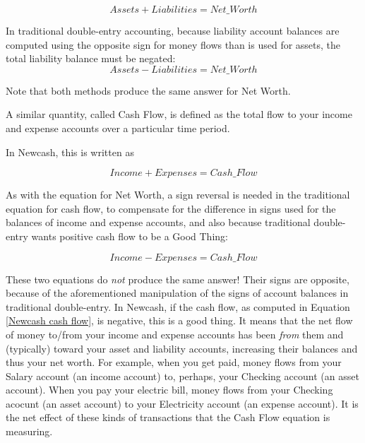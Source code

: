 \documentclass{report}
\begin{document}
\begin{equation}
\label{Fundamental Equation}
Assets + Liabilities = Net\_Worth
\end{equation}

In traditional double-entry accounting, because liability account balances are computed using the opposite sign for money flows than is used for assets, the total liability balance must be negated: 
\begin{equation}
Assets - Liabilities = Net\_Worth
\end{equation}

Note that both methods produce the same answer for Net Worth.

A similar quantity, called Cash Flow, is defined as the total flow to your income and expense accounts over a particular time period.

In Newcash, this is written as

\begin{equation}
\label{Newcash cash flow}
Income + Expenses = Cash\_Flow
\end{equation}

As with the equation for Net Worth, a sign reversal is needed in the traditional equation for cash flow, to compensate for the difference in signs used for the balances of income and expense accounts, and also because traditional double-entry wants positive cash flow to be a Good Thing:

\begin{equation}
\label{Traditional cash flow}
Income - Expenses = Cash\_Flow
\end{equation}

These two equations do \emph{not} produce the same answer! Their signs are opposite, because of the aforementioned manipulation of the signs of account balances in traditional double-entry. In Newcash, if the cash flow, as computed in Equation \ref{Newcash cash flow}, is negative, this is a good thing. It means that the net flow of money to/from your income and expense accounts has been \emph{from} them and (typically) toward your asset and liability accounts, increasing their balances and thus your net worth.  For example, when you get paid, money flows from your Salary account (an income account) to, perhaps, your Checking account (an asset account). When you pay your electric bill, money flows from your Checking acocunt (an asset account) to your Electricity account (an expense account). It is the net effect of these kinds of transactions that the Cash Flow equation is measuring. 
\end{document}
